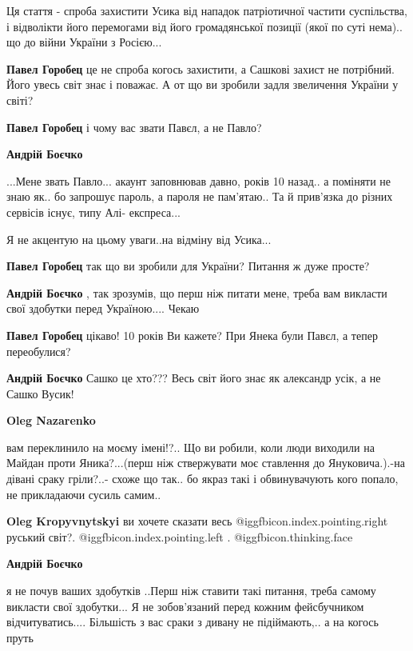 \begin{itemize}
Ця стаття - спроба захистити Усика від нападок патріотичної частити
суспільства, і відволікти його перемогами від його громадянської позиції (якої
по суті нема).. що до війни України з Росією...

\begin{itemize} %
\textbf{Павел Горобец} це не спроба когось захистити, а Сашкові захист не потрібний. Його увесь світ знає і поважає. А от що ви зробили задля звеличення України у світі?


\textbf{Павел Горобец} і чому вас звати Павєл, а не Павло?

\textbf{Андрій Боєчко} 

...Мене звать Павло... акаунт заповнював давно, років 10 назад.. а поміняти не
знаю як.. бо запрошує пароль, а пароля не пам'ятаю.. Та й прив'язка до різних
сервісів існує, типу Алі- експреса...

Я не акцентую на цьому уваги..на відміну від Усика...


\textbf{Павел Горобец} так що ви зробили для України? Питання ж дуже просте?

\textbf{Андрій Боєчко} , так зрозумів, що перш ніж питати мене, треба вам викласти свої здобутки перед Україною....
Чекаю

\textbf{Павел Горобец} цікаво! 10 років Ви кажете? При Янека були Павєл, а тепер переобулися?

\textbf{Андрій Боєчко} Сашко це хто??? Весь світ його знає як александр усік, а не Сашко Вусик!

\textbf{Oleg Nazarenko} 

вам переклинило на моєму імені!?.. Що ви робили, коли люди виходили на Майдан
проти Яника?...(перш ніж ствержувати моє ставлення до Януковича.).-на дівані
сраку гріли?..- схоже що так.. бо якраз такі і обвинувачують кого попало, не
прикладаючи сусиль самим..

\textbf{Oleg Kropyvnytskyi} ви хочете сказати весь  @igg{fbicon.index.pointing.right} руський світ?. @igg{fbicon.index.pointing.left} . @igg{fbicon.thinking.face} 

\textbf{Андрій Боєчко} 

я не почув ваших здобутків ..Перш ніж ставити такі питання, треба самому
викласти свої здобутки...  Я не зобов'язаний перед кожним фейсбучником
відчитуватись.... Більшість з вас сраки з дивану не підіймають,.. а на когось
пруть


\end{itemize}
\end{itemize}
